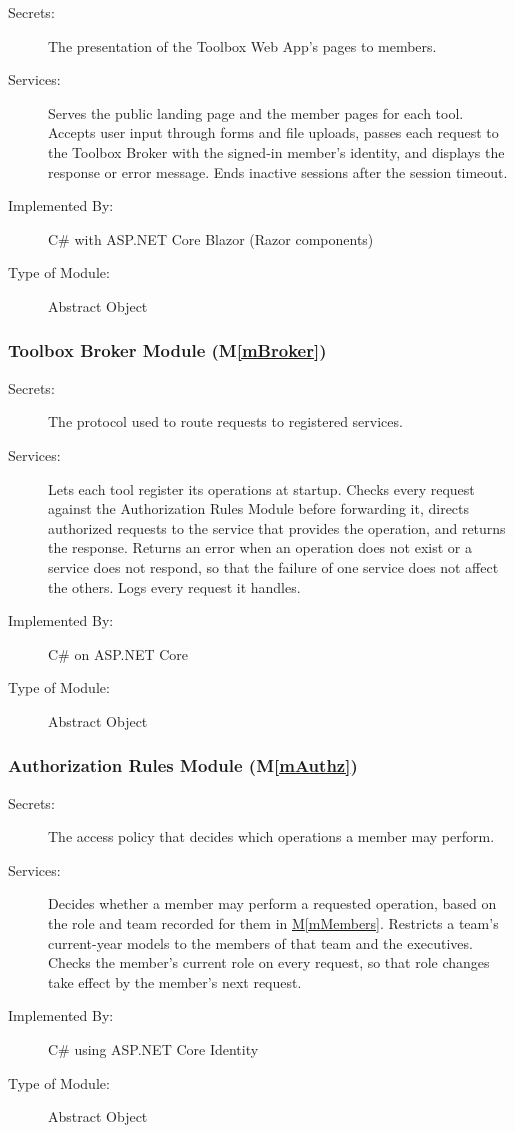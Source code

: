 \documentclass[12pt, titlepage]{article}
\newcommand{\mref}[1]{\hyperref[#1:dec]{M\ref*{#1}}}
\begin{document}
\begin{description}
\item[Secrets:] The presentation of the Toolbox Web App's pages to members.
\item[Services:] Serves the public landing page and the member pages for each
  tool. Accepts user input through forms and file uploads, passes each request
  to the Toolbox Broker with the signed-in member's identity, and displays the
  response or error message. Ends inactive sessions after the session timeout.
\item[Implemented By:] C\# with ASP.NET Core Blazor (Razor components)
\item[Type of Module:] Abstract Object
\end{description}

\subsubsection{Toolbox Broker Module (M\ref*{mBroker})}\label{mBroker:dec}

\begin{description}
\item[Secrets:] The protocol used to route requests to registered services.
\item[Services:] Lets each tool register its operations at startup. Checks every
  request against the Authorization Rules Module before forwarding it, directs
  authorized requests to the service that provides the operation, and returns
  the response. Returns an error when an operation does not exist or a service
  does not respond, so that the failure of one service does not affect the
  others. Logs every request it handles.
\item[Implemented By:] C\# on ASP.NET Core
\item[Type of Module:] Abstract Object
\end{description}

\subsubsection{Authorization Rules Module (M\ref*{mAuthz})}\label{mAuthz:dec}

\begin{description}
\item[Secrets:] The access policy that decides which operations a member may perform.
\item[Services:] Decides whether a member may perform a requested operation,
  based on the role and team recorded for them in \mref{mMembers}. Restricts a
  team's current-year models to the members of that team and the executives.
  Checks the member's current role on every request, so that role changes take
  effect by the member's next request.
\item[Implemented By:] C\# using ASP.NET Core Identity
\item[Type of Module:] Abstract Object
\end{description}
\end{document}
